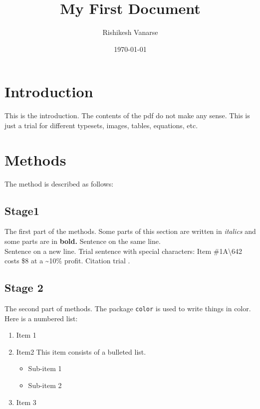 \documentclass[a4paper, 12pt]{article}
\begin{document}
\title{My First Document}
\author{Rishikesh Vanarse}
\date{\today}
\maketitle

\tableofcontents
\newpage
{}



\section{Introduction}
This is the introduction. The contents of the pdf do not make any sense. This is just a trial for different typesets, images, tables, equations, etc.




\section{Methods}
The method is described as follows:


\subsection{Stage1}
\label{sec1}
The first part of the methods. Some parts of this section are written in \textit{italics} and some parts are in \textbf{bold.}
Sentence on the same line.
\\Sentence on a new line.
Trial sentence with special characters: Item \#1A\textbackslash642 costs \$8 at a \~{}10\% profit. Citation trial \cite{Birdetal2001}.



\subsection{Stage 2}
The second part of methods.
The package \texttt{color} is used to write things in {\color{red}color}.
Here is a numbered list: 

\begin{enumerate}
\item{Item 1}
\item{Item2}
This item consists of a bulleted list.
\begin{itemize}
\item{Sub-item 1}
\item{Sub-item 2}
\end{itemize}
\item{Item 3}
\end{enumerate}
\end{document}
